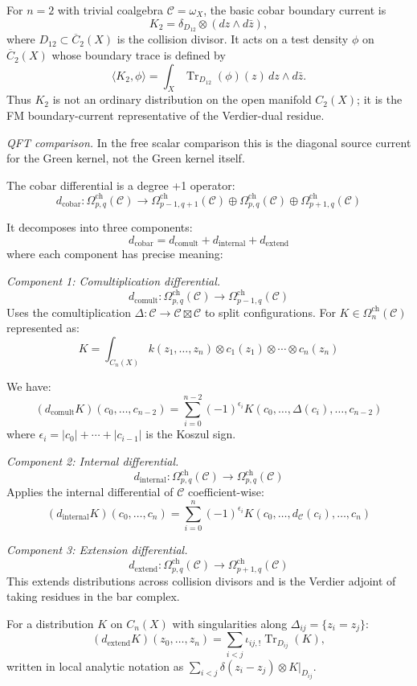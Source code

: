 \begin{example}\label{ex:simplest-cobar}
For $n=2$ with trivial coalgebra $\mathcal{C} = \omega_X$, the basic
cobar boundary current is
\[K_2=\delta_{D_{12}}\otimes (dz\wedge d\bar z),\]
where $D_{12}\subset \overline{C}_2(X)$ is the collision divisor. It
acts on a test density $\phi$ on $\overline{C}_2(X)$ whose boundary
trace is defined by
\[
\langle K_2,\phi\rangle
=\int_X \operatorname{Tr}_{D_{12}}(\phi)(z)\,dz\wedge d\bar z.
\]
Thus $K_2$ is not an ordinary distribution on the open manifold
$C_2(X)$; it is the FM boundary-current representative of the
Verdier-dual residue.

\emph{QFT comparison.} In the free scalar comparison this is the
diagonal source current for the Green kernel, not the Green kernel
itself.
\end{example}

\begin{theorem}\label{thm:cobar-diff-geom}
The cobar differential is a degree +1 operator:
\[d_{\text{cobar}}: \Omega^{\text{ch}}_{p,q}(\mathcal{C}) \to
\Omega^{\text{ch}}_{p-1,q+1}(\mathcal{C}) \oplus \Omega^{\text{ch}}_{p,q}(\mathcal{C})
\oplus \Omega^{\text{ch}}_{p+1,q}(\mathcal{C})\]

It decomposes into three components:
\[
d_{\text{cobar}} = d_{\text{comult}} + d_{\text{internal}} + d_{\text{extend}}
\]
where each component has precise meaning:

\emph{Component 1: Comultiplication differential.}
\[d_{\text{comult}}: \Omega^{\text{ch}}_{p,q}(\mathcal{C}) \to
\Omega^{\text{ch}}_{p-1,q}(\mathcal{C})\]
Uses the comultiplication $\Delta: \mathcal{C} \to \mathcal{C} \boxtimes \mathcal{C}$
to split configurations. For $K \in \Omega^{\text{ch}}_n(\mathcal{C})$ represented as:
\[K = \int_{C_n(X)} k(z_1, \ldots, z_n) \otimes c_1(z_1) \otimes \cdots \otimes c_n(z_n)\]

We have:
\[(d_{\text{comult}}K)(c_0, \ldots, c_{n-2}) = \sum_{i=0}^{n-2} (-1)^{\epsilon_i}
K(c_0, \ldots, \Delta(c_i), \ldots, c_{n-2})\]
where $\epsilon_i = |c_0| + \cdots + |c_{i-1}|$ is the Koszul sign.

\emph{Component 2: Internal differential.}
\[d_{\text{internal}}: \Omega^{\text{ch}}_{p,q}(\mathcal{C}) \to
\Omega^{\text{ch}}_{p,q}(\mathcal{C})\]
Applies the internal differential of $\mathcal{C}$ coefficient-wise:
\[(d_{\text{internal}}K)(c_0, \ldots, c_n) = \sum_{i=0}^n (-1)^{\epsilon_i}
K(c_0, \ldots, d_{\mathcal{C}}(c_i), \ldots, c_n)\]

\emph{Component 3: Extension differential.}
\[d_{\text{extend}}: \Omega^{\text{ch}}_{p,q}(\mathcal{C}) \to
\Omega^{\text{ch}}_{p+1,q}(\mathcal{C})\]
This extends distributions across collision divisors and is the
Verdier adjoint of taking residues in the bar complex.

For a distribution $K$ on $C_n(X)$ with singularities along $\Delta_{ij} =
\{z_i = z_j\}$:
\[
(d_{\text{extend}}K)(z_0, \ldots, z_n)
=\sum_{i<j}\iota_{ij,!}\operatorname{Tr}_{D_{ij}}(K),
\]
written in local analytic notation as
$\sum_{i<j}\delta(z_i-z_j)\otimes K|_{D_{ij}}$.

\end{theorem}

